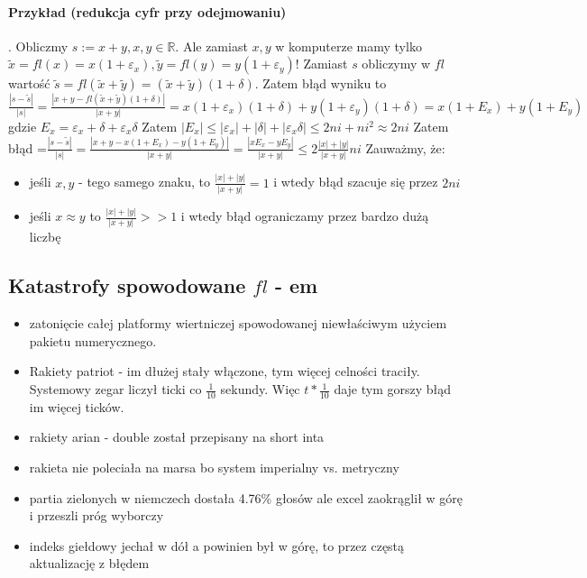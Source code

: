 \documentclass{article}
\begin{document}
\paragraph{Przykład (redukcja cyfr przy odejmowaniu)}. Obliczmy $ s:=x+y, x,y\in\mathbb{R} $. Ale zamiast $ x, y $ w komputerze mamy tylko $\tilde{x}= fl(x) = x(1+\varepsilon_x), \tilde{y}=fl(y)=y(1+\varepsilon_y) $!
Zamiast $ s $ obliczymy w $ fl $ wartość $ \tilde{s}=fl(\tilde{x}+\tilde{y})= (\tilde{x}+\tilde{y})(1+\delta)$.
Zatem błąd wyniku to $ \frac{|s-\tilde{s}|}{|s|} = \frac{|x+y-fl(\tilde{x}+\tilde{y})(1+\delta)|}{|x+y|}=x(1+\varepsilon_x)(1+\delta)+ y(1+\varepsilon_y)(1+\delta)=x(1+E_x)+y(1+E_y)$ gdzie $ E_x=\varepsilon_x+\delta+\varepsilon_x\delta $
Zatem $ |E_x|\le|\varepsilon_x|+|\delta|+ |\varepsilon_x\delta|\le2ni+ni^2\approx2ni $
Zatem błąd =$ \frac{|s-\tilde{s}|}{|s|} =\frac{|x+y-x(1+E_x)-y(1+E_y)|}{|x+y|}=\frac{|xE_x-yE_y|}{|x+y|}\le2\frac{|x|+|y|}{|x+y|}ni$
Zauważmy, że:
\begin{itemize}
\item jeśli $ x, y $ - tego samego znaku, to $ \frac{|x|+|y|}{|x+y|}=1 $ i wtedy błąd szacuje się przez $ 2ni $
\item jeśli $ x\approx y $ to $ \frac{|x|+|y|}{|x+y|} >> 1 $ i wtedy błąd ograniczamy przez bardzo dużą liczbę
\end{itemize}
\subsection{Katastrofy spowodowane $ fl $ - em}
\begin{itemize}
\item zatonięcie całej platformy wiertniczej spowodowanej niewłaściwym użyciem pakietu numerycznego.
\item Rakiety patriot - im dłużej stały włączone, tym więcej celności traciły. Systemowy zegar liczył ticki co $ \frac1{10} $ sekundy. Więc $t * \frac1{10}$ daje tym gorszy błąd im więcej ticków.
\item rakiety arian - double został przepisany na short inta
\item rakieta nie poleciała na marsa bo system imperialny vs. metryczny
\item partia zielonych w niemczech dostała 4.76\% głosów ale excel zaokrąglił w górę i przeszli próg wyborczy
\item indeks giełdowy jechał w dół a powinien był w górę, to przez częstą aktualizację z błędem

\end{itemize}
\end{document}
